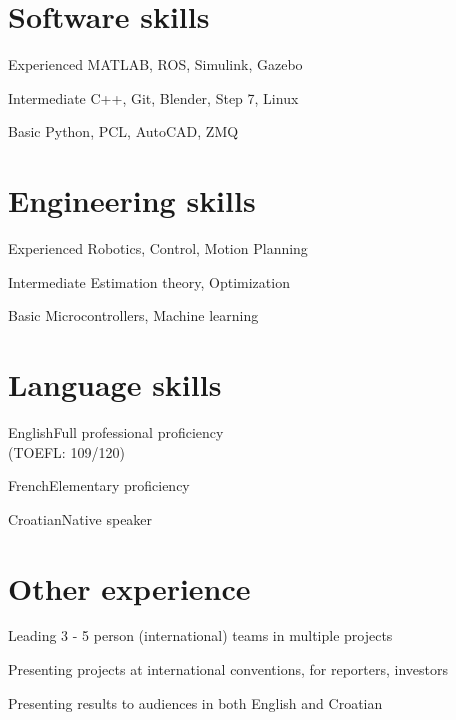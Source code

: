 \documentclass{tccv}
\begin{document}
\section{Software skills}
\begin{factlist}

\item{Experienced}
     {MATLAB, ROS, Simulink, Gazebo}

\item{Intermediate}
     {C++,  Git, Blender, Step 7, Linux}

\item{Basic}
     {Python, PCL, AutoCAD, ZMQ}

\end{factlist}

\section{Engineering skills}
\begin{factlist}
\item{Experienced}
	 {Robotics, Control, Motion Planning}
	 
\item{Intermediate}
     {Estimation theory, Optimization}
    
\item{Basic}
     {Microcontrollers, Machine learning} 
     
\end{factlist}

\section{Language skills}

\begin{factlist}
\item{English}{Full professional proficiency \\(TOEFL: 109/120)}
\item{French}{Elementary proficiency}
\item{Croatian}{Native speaker}
\end{factlist}

\section{Other experience}
\begin{factlist}
\item{ }{Leading 3 - 5 person (international) teams in multiple projects}
\item{ }{Presenting projects at international conventions, for reporters, investors}
\item{ }{Presenting results to audiences in both English and Croatian}
\end{factlist}
\end{document}
